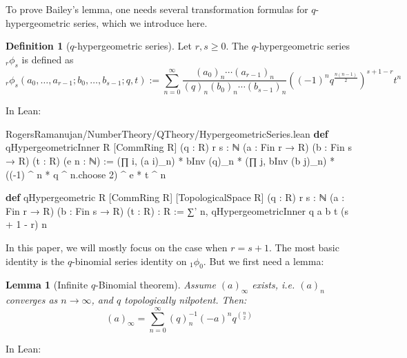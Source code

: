 \documentclass[12pt]{amsart}
\newtheorem{lemma}[theorem]{Lemma}
\theoremstyle{definition}
\newtheorem{definition}[theorem]{Definition}
\theoremstyle{remark}
\numberwithin{equation}{subsection}
\newcommand{\kw}[1]{\textcolor{keywordcolor}{\textbf{#1}}}
\newcommand{\var}[1]{\textcolor{tacticcolor}{#1}}
\newcommand{\prop}[1]{\textcolor{sortcolor}{#1}}
\newcommand{\num}[1]{\textcolor{numcolor}{#1}}
\newcommand{\imp}[1]{\textcolor{commentcolor}{\textbraceleft#1\textbraceright}}
\begin{document}
To prove Bailey's lemma, one needs several transformation formulas for $q$-hypergeometric series, which we introduce here.

\begin{definition}[$q$-hypergeometric series]
Let $r, s \ge 0$. The $q$-hypergeometric series ${}_{r}\phi_{s}$ is defined as
\begin{equation}
    {}_{r}\phi_{s}\left(a_0, \dots, a_{r-1}; b_0, \dots, b_{s-1}; q, t\right) := \sum_{n=0}^{\infty} \frac{(a_0)_n \cdots (a_{r-1})_n}{(q)_n (b_0)_n \cdots (b_{s-1})_n} \left((-1)^n q^{\frac{n(n-1)}{2}}\right)^{s+1-r} t^n
\end{equation}
\end{definition}

In Lean:

\begin{code}{RogersRamanujan/NumberTheory/QTheory/HypergeometricSeries.lean}
\kw{def} qHypergeometricInner \imp{R} [CommRing \var{R}]
    (\var{q} : \var{R}) \imp{r s : ℕ} (\var{a} : Fin \var{r} → \var{R}) (\var{b} : Fin \var{s} → \var{R}) (\var{t} : \var{R}) (\var{e} \var{n} : ℕ) :=
  (∏ \var{i}, (\var{a} \var{i})_\var{n}) * bInv (\var{q})_\var{n} * (∏ \var{j}, bInv (\var{b} \var{j})_\var{n}) *
    ((-\num{1}) ^ \var{n} * \var{q} ^ \var{n}.\prop{choose} \num{2}) ^ \var{e} * \var{t} ^ \var{n}

\kw{def} qHypergeometric \imp{R} [CommRing \var{R}] [TopologicalSpace \var{R}]
    (\var{q} : \var{R}) \imp{r s : ℕ} (\var{a} : Fin \var{r} → \var{R}) (\var{b} : Fin \var{s} → \var{R}) (\var{t} : \var{R}) : \var{R} :=
  ∑' \var{n}, qHypergeometricInner \var{q} \var{a} \var{b} \var{t} (\var{s} + \num{1} - \var{r}) \var{n}
\end{code}

In this paper, we will mostly focus on the case when $r = s + 1$.
The most basic identity is the $q$-binomial series identity on ${}_{1}\phi_{0}$. But we first need a lemma:

\begin{lemma}[Infinite $q$-Binomial theorem]
    \label{lem:binom-thm-inf}\label{lem:poch-inf}
    Assume $(a)_\infty$ exists, i.e. $(a)_n$ converges as $n \to \infty$, and $q$ topologically nilpotent. Then:
    \begin{equation}
        (a)_\infty = \sum_{n=0}^\infty (q)_n^{-1} (-a)^n q^{\binom{n}{2}}
    \end{equation}
\end{lemma}

In Lean:
\end{document}

